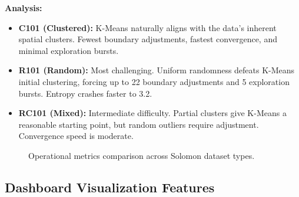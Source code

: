 \documentclass[10pt,conference]{IEEEtran}
\begin{document}
\textbf{Analysis:}
\begin{itemize}
    \item \textbf{C101 (Clustered):} K-Means naturally aligns with the data's inherent spatial clusters. Fewest boundary adjustments, fastest convergence, and minimal exploration bursts.
    \item \textbf{R101 (Random):} Most challenging. Uniform randomness defeats K-Means initial clustering, forcing up to 22 boundary adjustments and 5 exploration bursts. Entropy crashes faster to 3.2.
    \item \textbf{RC101 (Mixed):} Intermediate difficulty. Partial clusters give K-Means a reasonable starting point, but random outliers require adjustment. Convergence speed is moderate.
\end{itemize}

\begin{figure}[h]
\centering
{}
\caption{Operational metrics comparison across Solomon dataset types.}
\label{fig:dataset_compare}
\end{figure}

\subsection{Dashboard Visualization Features}
\end{document}
